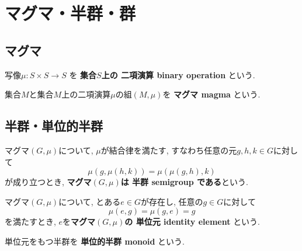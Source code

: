 \section{マグマ・半群・群}
\subsection{マグマ}
\begin{Def}
写像$\mu:S\times S\rightarrow S$
を{
\bf 集合$S$上の
二項演算 binary operation
}
という.
\end{Def}
\begin{Def}
集合$M$と集合$M$上の二項演算$\mu$の組$(M,\mu)$を
{\bf マグマ magma}
という.
\end{Def}
\subsection{半群・単位的半群}
\begin{Def}
マグマ$(G,\mu)$について,
$\mu$が結合律を満たす, すなわち任意の元$g,h,k\in G$に対して\[\mu(g,\mu(h,k))=\mu(\mu(g,h),k)\]
が成り立つとき, 
{\bf マグマ$(G,\mu)$は
半群 semigroup
である}という.
\end{Def}
\begin{Def}
マグマ$(G,\mu)$について, とある$e\in G$が存在し, 任意の$g\in G$に対して\[\mu(e,g)=\mu(g,e)=g\]を満たすとき, $e$を{\bf マグマ$(G,\mu)$の
単位元 identity element
}
という.
\end{Def}
\begin{Def}
単位元をもつ半群を{\bf 
単位的半群 monoid
}という.
\end{Def}
